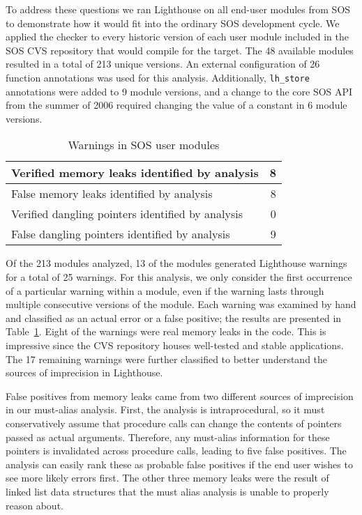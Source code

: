 To address these questions we ran Lighthouse on 
all end-user modules from SOS
to demonstrate
how it would fit into the ordinary SOS development cycle.  
We applied the checker to every
historic version of each user module included in the SOS CVS
repository that would compile for the  target.  The 48
available modules resulted in a total of 213 unique versions.
%
An external configuration of 26 function annotations was used for this
analysis.  
%
Additionally, {\tt lh\_store} annotations were added to 9 module versions,
and a change to the core SOS API from the summer of 2006 required
changing the value of a constant in 6 module versions.


\begin{table}
\caption{Warnings in SOS user modules}
%
\label{tab:module}
\centering 
\begin{tabular}{| l | r |}
    \hline 
    Verified memory leaks identified by analysis & 8 \\
    \hline
    False memory leaks identified by analysis & 8 \\
    \hline 
    Verified dangling pointers identified by analysis & 0 \\
    \hline 
    False dangling pointers identified by analysis & 9 \\
    \hline 
\end{tabular} 
%
\end{table}

Of the 213 modules analyzed, 13 of the modules generated Lighthouse 
warnings for a
total of 25 warnings.
For this
analysis, we only consider the first occurrence of a particular warning
within a module, even if the warning lasts through multiple consecutive
versions of the module.  
%
Each warning was examined by hand and classified as an actual error or
a false positive; the results are presented in Table~\ref{tab:module}.  
%
Eight of the warnings were real memory leaks in the code.
This is impressive since the CVS repository houses well-tested and stable
applications.
%
The 17 remaining warnings were further classified to better understand
the sources of imprecision in Lighthouse.  

\smallskip{}

False positives from memory leaks came from two different sources of
imprecision in our must-alias analysis.
First, the analysis is intraprocedural, so it must
conservatively
assume that procedure calls can change the contents of pointers passed
as actual arguments.  Therefore, any must-alias information for these
pointers is invalidated across procedure calls, leading to five false
positives.
The analysis can easily rank these as probable false
positives if the end user wishes to see more likely errors first.  The
other three memory leaks were the result of linked list data structures
that the must alias analysis is unable to properly reason about.  

